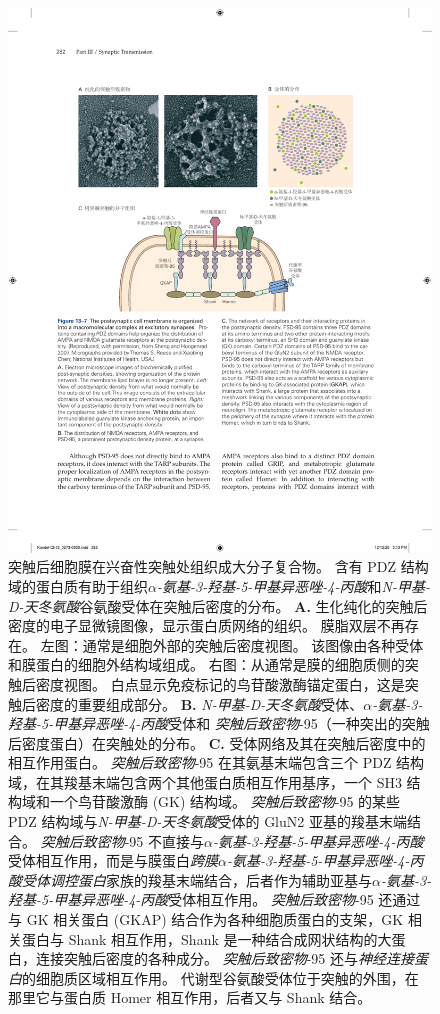 \begin{figure}[htbp]
	\centering
	\includegraphics[width=0.7\linewidth]{chap13/fig_13_7}
	\caption{突触后细胞膜在兴奋性突触处组织成大分子复合物。
		含有 PDZ 结构域的蛋白质有助于组织\textit{$\alpha$-氨基-3-羟基-5-甲基异恶唑-4-丙酸}和\textit{N-甲基-D-天冬氨酸}谷氨酸受体在突触后密度的分布\cite{sheng2007postsynaptic}。
		\textbf{A.} 生化纯化的突触后密度的电子显微镜图像，显示蛋白质网络的组织。
		膜脂双层不再存在。
		左图：通常是细胞外部的突触后密度视图。
		该图像由各种受体和膜蛋白的细胞外结构域组成。
		右图：从通常是膜的细胞质侧的突触后密度视图。
		白点显示免疫标记的鸟苷酸激酶锚定蛋白，这是突触后密度的重要组成部分。
		\textbf{B.} \textit{N-甲基-D-天冬氨酸}受体、\textit{$\alpha$-氨基-3-羟基-5-甲基异恶唑-4-丙酸}受体和 \textit{突触后致密物}-95（一种突出的突触后密度蛋白）在突触处的分布。
		\textbf{C.} 受体网络及其在突触后密度中的相互作用蛋白。
		\textit{突触后致密物}-95 在其氨基末端包含三个 PDZ 结构域，在其羧基末端包含两个其他蛋白质相互作用基序，一个 SH3 结构域和一个鸟苷酸激酶 (GK) 结构域。
		\textit{突触后致密物}-95 的某些 PDZ 结构域与\textit{N-甲基-D-天冬氨酸}受体的 GluN2 亚基的羧基末端结合。
		\textit{突触后致密物}-95 不直接与\textit{$\alpha$-氨基-3-羟基-5-甲基异恶唑-4-丙酸}受体相互作用，而是与膜蛋白\textit{跨膜$\alpha$-氨基-3-羟基-5-甲基异恶唑-4-丙酸受体调控蛋白}家族的羧基末端结合，后者作为辅助亚基与\textit{$\alpha$-氨基-3-羟基-5-甲基异恶唑-4-丙酸}受体相互作用。
		\textit{突触后致密物}-95 还通过与 GK 相关蛋白 (GKAP) 结合作为各种细胞质蛋白的支架，GK 相关蛋白与 Shank 相互作用，Shank 是一种结合成网状结构的大蛋白，连接突触后密度的各种成分。
		\textit{突触后致密物}-95 还与\textit{神经连接蛋白}的细胞质区域相互作用。
		代谢型谷氨酸受体位于突触的外围，在那里它与蛋白质 Homer 相互作用，后者又与 Shank 结合。}
	\label{fig:13_7}
\end{figure}


